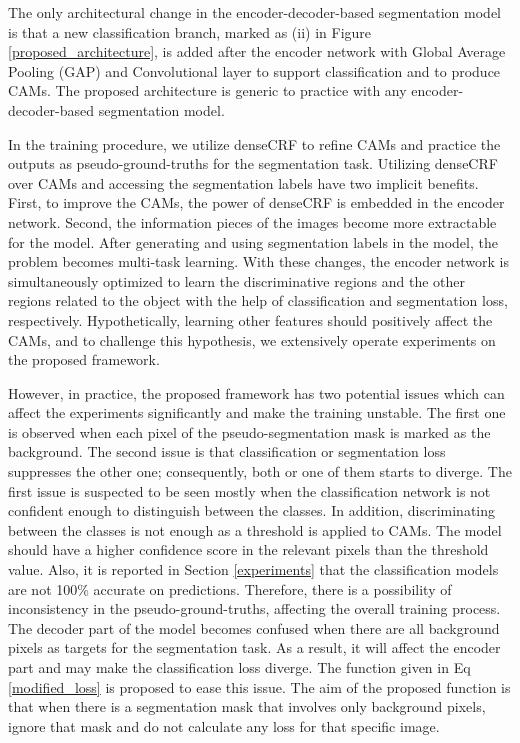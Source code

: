 \documentclass[sn-mathphys]{sn-jnl}
\theoremstyle{thmstyleone}
\theoremstyle{thmstyletwo}\newtheorem{example}{Example}\newtheorem{remark}{Remark}
\theoremstyle{thmstylethree}\newtheorem{definition}{Definition}
\begin{document}
The only architectural change in the encoder-decoder-based segmentation model is that a new classification branch, marked as (ii) in Figure \ref{proposed_architecture}, is added after the encoder network with Global Average Pooling (GAP) and  Convolutional layer to support classification and to produce CAMs. The proposed architecture is generic to practice with any encoder-decoder-based segmentation model.

In the training procedure, we utilize denseCRF to refine CAMs and practice the outputs as pseudo-ground-truths for the segmentation task. Utilizing denseCRF over CAMs and accessing the segmentation labels have two implicit benefits. First, to improve the CAMs, the power of denseCRF is embedded in the encoder network. Second, the information pieces of the images become more extractable for the model. After generating and using segmentation labels in the model, the problem becomes multi-task learning. With these changes, the encoder network is simultaneously optimized to learn the discriminative regions and the other regions related to the object with the help of classification and segmentation loss, respectively. Hypothetically, learning other features should positively affect the CAMs, and to challenge this hypothesis, we extensively operate experiments on the proposed framework.

However, in practice, the proposed framework has two potential issues which can affect the experiments significantly and make the training unstable. The first one is observed when each pixel of the pseudo-segmentation mask is marked as the background. The second issue is that classification or segmentation loss suppresses the other one; consequently, both or one of them starts to diverge. The first issue is suspected to be seen mostly when the classification network is not confident enough to distinguish between the classes. In addition, discriminating between the classes is not enough as a threshold is applied to CAMs. The model should have a higher confidence score in the relevant pixels than the threshold value. Also, it is reported in Section \ref{experiments} that the classification models are not 100\% accurate on predictions. Therefore, there is a possibility of inconsistency in the pseudo-ground-truths, affecting the overall training process. The decoder part of the model becomes confused when there are all background pixels as targets for the segmentation task. As a result, it will affect the encoder part and may make the classification loss diverge.  
The function given in Eq \ref{modified_loss} is proposed to ease this issue. The aim of the proposed function is that when there is a segmentation mask that involves only background pixels, ignore that mask and do not calculate any loss for that specific image.
\end{document}
